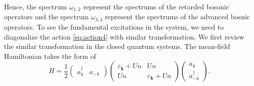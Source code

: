\documentclass[aps,superscriptaddress,notitlepage,longbibliography]{revtex4-1}
\begin{document}
Hence, the spectrum $\omega_{1,2}$ represent the spectrums of the
retarded bosonic operators and the spectrum $\omega_{3,4}$ represent
the spectrums of the advanced bosnic operators. To see the fundamental
excitations in the system, we need to diagonalize the action \eqref{eq:action4}
with similar transformation. We first review the similar transformation
in the closed quantum systems. The mean-field Hamiltonian takes the
form of 
\begin{equation}
H=\frac{1}{2}\left(\begin{array}{cc}
a_{k}^{\dagger} & a_{-k}\end{array}\right)\left(\begin{array}{cc}
\varepsilon_{\bm{k}}+Un & Un\\
Un & \varepsilon_{\bm{k}}+Un
\end{array}\right)\left(\begin{array}{c}
a_{k}\\
a_{-k}^{\dagger}
\end{array}\right).
\end{equation}
\end{document}
